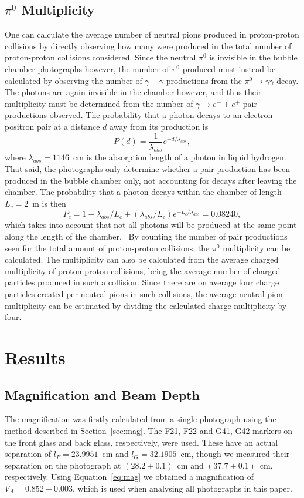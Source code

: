 \documentclass[twocolumn]{article}
\begin{document}
\subsection{$\pi^0$ Multiplicity}
One can calculate the average number of neutral pions produced in proton-proton collisions by directly observing how many were produced in the total number of proton-proton collisions considered. Since the neutral $\pi^0$ is invisible in the bubble chamber photographs however, the number of $\pi^0$ produced must instead be calculated by observing the number of $\gamma-\gamma$ productions from the $\pi^0 \to \gamma \gamma$ decay. The photons are again invisible in the chamber however, and thus their multiplicity must be determined from the number of $\gamma \to e^- + e^+$ pair productions observed. The probability that a photon decays to an electron-positron pair at a distance $d$ away from its production is~\cite{seul}
\begin{equation*}
P(d) = \frac {1} {\lambda_{abs}} e^{-d/\lambda_{abs}},
\end{equation*}
where $\lambda_{abs} = 1146$~cm is the absorption length of a photon in liquid hydrogen. That said, the photographs only determine whether a pair production has been produced in the bubble chamber only, not accounting for decays after leaving the chamber. The probability that a photon decays within the chamber of length $L_c=2$~m is then
\begin{equation} \label{eq:mult}
P_c = 1-\lambda_{abs}/L_c +  (\lambda_{abs}/L_c) e^{-L_c/\lambda_{abs}} = 0.08240,
\end{equation}
which takes into account that not all photons will be produced at the same point along the length of the chamber.~\cite{seul} By counting the number of pair productions seen for the total amount of proton-proton collisions, the $\pi^0$ multiplicity can be calculated. The multiplicity can also be calculated from the average charged multiplicity of proton-proton collisions, being the average number of charged particles produced in such a collision. Since there are on average four charge particles created per neutral pions in such collisions, the average neutral pion multiplicity can be estimated by dividing the calculated charge multiplicity by four.

\section{Results} \label{sec:res}
\subsection{Magnification and Beam Depth}
The magnification was firstly calculated from a single photograph using the method described in Section~\ref{sec:mag}. The F21, F22 and G41, G42 markers on the front glass and back glass, respectively, were used. These have an actual separation of $l_F = 23.9951$~cm and $l_G = 32.1905$~cm, though we measured their separation on the photograph at $(28.2 \pm 0.1)$~cm and $(37.7 \pm 0.1)$~cm, respectively. Using Equation~\ref{eq:mag} we obtained a magnification of $V_A = 0.852 \pm 0.003$, which is used when analysing all photographs in this paper. \\
\end{document}
